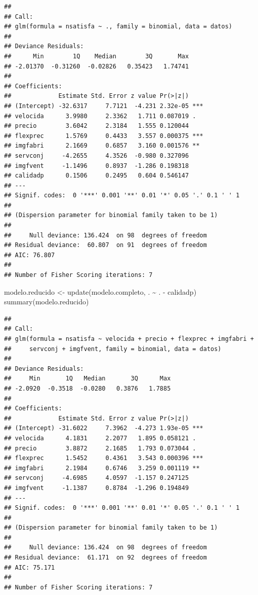 \documentclass[
]{book}
\newenvironment{Shaded}{\begin{snugshade}}{\end{snugshade}}
\newcommand{\FunctionTok}[1]{\textcolor[rgb]{0.00,0.00,0.00}{#1}}
\newcommand{\NormalTok}[1]{#1}
\newcommand{\OtherTok}[1]{\textcolor[rgb]{0.56,0.35,0.01}{#1}}
\newcommand{\SpecialCharTok}[1]{\textcolor[rgb]{0.00,0.00,0.00}{#1}}
\theoremstyle{break}
\begin{document}
\begin{verbatim}
## 
## Call:
## glm(formula = nsatisfa ~ ., family = binomial, data = datos)
## 
## Deviance Residuals: 
##      Min        1Q    Median        3Q       Max  
## -2.01370  -0.31260  -0.02826   0.35423   1.74741  
## 
## Coefficients:
##             Estimate Std. Error z value Pr(>|z|)    
## (Intercept) -32.6317     7.7121  -4.231 2.32e-05 ***
## velocida      3.9980     2.3362   1.711 0.087019 .  
## precio        3.6042     2.3184   1.555 0.120044    
## flexprec      1.5769     0.4433   3.557 0.000375 ***
## imgfabri      2.1669     0.6857   3.160 0.001576 ** 
## servconj     -4.2655     4.3526  -0.980 0.327096    
## imgfvent     -1.1496     0.8937  -1.286 0.198318    
## calidadp      0.1506     0.2495   0.604 0.546147    
## ---
## Signif. codes:  0 '***' 0.001 '**' 0.01 '*' 0.05 '.' 0.1 ' ' 1
## 
## (Dispersion parameter for binomial family taken to be 1)
## 
##     Null deviance: 136.424  on 98  degrees of freedom
## Residual deviance:  60.807  on 91  degrees of freedom
## AIC: 76.807
## 
## Number of Fisher Scoring iterations: 7
\end{verbatim}

\begin{Shaded}
\begin{Highlighting}[]
\NormalTok{modelo.reducido }\OtherTok{\textless{}{-}} \FunctionTok{update}\NormalTok{(modelo.completo, . }\SpecialCharTok{\textasciitilde{}}\NormalTok{ . }\SpecialCharTok{{-}}\NormalTok{ calidadp)}
\FunctionTok{summary}\NormalTok{(modelo.reducido)}
\end{Highlighting}
\end{Shaded}

\begin{verbatim}
## 
## Call:
## glm(formula = nsatisfa ~ velocida + precio + flexprec + imgfabri + 
##     servconj + imgfvent, family = binomial, data = datos)
## 
## Deviance Residuals: 
##     Min       1Q   Median       3Q      Max  
## -2.0920  -0.3518  -0.0280   0.3876   1.7885  
## 
## Coefficients:
##             Estimate Std. Error z value Pr(>|z|)    
## (Intercept) -31.6022     7.3962  -4.273 1.93e-05 ***
## velocida      4.1831     2.2077   1.895 0.058121 .  
## precio        3.8872     2.1685   1.793 0.073044 .  
## flexprec      1.5452     0.4361   3.543 0.000396 ***
## imgfabri      2.1984     0.6746   3.259 0.001119 ** 
## servconj     -4.6985     4.0597  -1.157 0.247125    
## imgfvent     -1.1387     0.8784  -1.296 0.194849    
## ---
## Signif. codes:  0 '***' 0.001 '**' 0.01 '*' 0.05 '.' 0.1 ' ' 1
## 
## (Dispersion parameter for binomial family taken to be 1)
## 
##     Null deviance: 136.424  on 98  degrees of freedom
## Residual deviance:  61.171  on 92  degrees of freedom
## AIC: 75.171
## 
## Number of Fisher Scoring iterations: 7
\end{verbatim}
\end{document}
